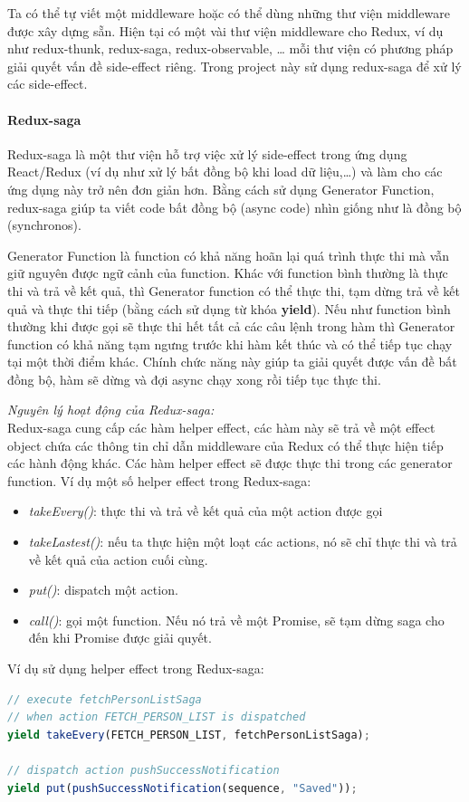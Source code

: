 Ta có thể tự viết một middleware hoặc có thể dùng những thư
viện middleware được xây dựng sẵn. Hiện tại có một vài thư viện
middleware cho Redux, ví dụ như redux-thunk, redux-saga,
redux-observable, … mỗi thư viện có phương pháp giải quyết
vấn đề side-effect riêng.
Trong project này sử dụng redux-saga để xử lý các side-effect.

\paragraph{Redux-saga}
Redux-saga là một thư viện hỗ trợ việc xử lý side-effect trong
ứng dụng React/Redux (ví dụ như xử lý bất đồng bộ khi load dữ liệu,…)
và làm cho các ứng dụng này trở nên đơn giản hơn.
Bằng cách sử dụng Generator Function, redux-saga giúp ta viết
code bất đồng bộ (async code) nhìn giống như là đồng bộ (synchronos).

Generator Function là function có khả năng hoãn lại quá trình
thực thi mà vẫn giữ nguyên được ngữ cảnh của function. Khác với
function bình thường là thực thi và trả về kết quả,
thì Generator function có thể thực thi, tạm dừng trả về
kết quả và thực thi tiếp (bằng cách sử dụng từ khóa \textbf{yield}).
Nếu như function bình thường khi được gọi sẽ thực thi hết tất cả
các câu lệnh trong hàm thì Generator function có khả năng tạm ngưng
trước khi hàm kết thúc và có thể tiếp tục chạy tại một thời điểm khác.
Chính chức năng này giúp ta giải quyết được vấn đề bất đồng bộ,
hàm sẽ dừng và đợi async chạy xong rồi tiếp tục thực thi.

\textit{Nguyên lý hoạt động của Redux-saga:} \\
Redux-saga cung cấp các hàm helper effect, các hàm này sẽ
trả về một effect object chứa các thông tin chỉ dẫn middleware
của Redux có thể thực hiện tiếp các hành động khác. Các hàm
helper effect sẽ được thực thi trong các generator function.
Ví dụ một số helper effect trong Redux-saga:
\begin{itemize}
\item \textit{takeEvery()}:
    thực thi và trả về kết quả của một action được gọi
\item \textit{takeLastest()}: nếu ta thực hiện một loạt các actions,
    nó sẽ chỉ thực thi và trả về kết quả của action cuối cùng.
\item \textit{put()}: dispatch một action.
\item \textit{call()}: gọi một function. Nếu nó trả về một Promise,
    sẽ tạm dừng saga cho đến khi Promise được giải quyết.
\end{itemize}
Ví dụ sử dụng helper effect trong Redux-saga:
\begin{lstlisting}[language=JavaScript,caption={Sử dụng Redux-Saga},captionpos=b]
// execute fetchPersonListSaga
// when action FETCH_PERSON_LIST is dispatched
yield takeEvery(FETCH_PERSON_LIST, fetchPersonListSaga);

// dispatch action pushSuccessNotification 
yield put(pushSuccessNotification(sequence, "Saved"));
\end{lstlisting}

